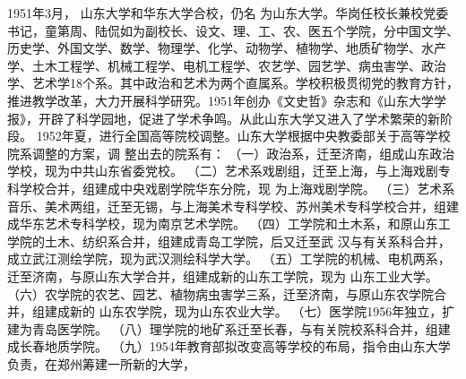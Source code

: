 \documentclass[openany]{sduthesis} %
\begin{document}
1951年3月， 山东大学和华东大学合校，仍名 为山东大学。华岗任校长兼校党委书记，童第周、陆侃如为副校长、设文、理、工、农、医五个学院，分中国文学、历史学、外国文学、数学、物理学、化学、动物学、植物学、地质矿物学、水产学、土木工程学、机械工程学、电机工程学、农艺学、园艺学、病虫害学、政治 学、艺术学18个系。其中政治和艺术为两个直属系。学校积极贯彻党的教育方针，推进教学改革，大力开展科学研究。1951年创办《文史哲》杂志和《山东大学学报》，开辟了科学园地，促进了学术争鸣。从此山东大学又进入了学术繁荣的新阶段。 1952年夏，进行全国高等院校调整。山东大学根据中央教委部关于高等学校院系调整的方案，调 整出去的院系有： （一）政治系，迁至济南，组成山东政治学校，现为中共山东省委党校。 （二）艺术系戏剧组，迁至上海，与上海戏剧专科学校合并，组建成中央戏剧学院华东分院，现 为上海戏剧学院。 （三）艺术系音乐、美术两组，迁至无锡，与上海美术专科学校、苏州美术专科学校合并，组建 成华东艺术专科学校，现为南京艺术学院。 （四）工学院和土木系，和原山东工学院的土木、纺织系合并，组建成青岛工学院，后又迁至武 汉与有关系科合并，成立武江测绘学院，现为武汉测绘科学大学。 （五）工学院的机械、电机两系，迁至济南，与原山东大学合并，组建成新的山东工学院，现为 山东工业大学。 （六）农学院的农艺、园艺、植物病虫害学三系，迁至济南，与原山东农学院合并，组建成新的 山东农学院，现为山东农业大学。 （七）医学院1956年独立，扩建为青岛医学院。 （八）理学院的地矿系迁至长春，与有关院校系科合并，组建成长春地质学院。 （九）1954年教育部拟改变高等学校的布局，指令由山东大学负责，在郑州筹建一所新的大学，
\end{document}
